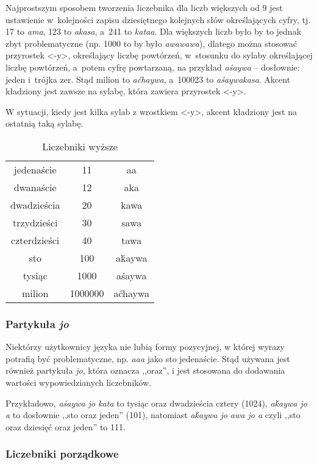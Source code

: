 \begin{spacing}{1.1}
Najprostszym sposobem tworzenia liczebnika dla liczb większych od 9 jest
ustawienie w~kolejności zapisu dziesiętnego kolejnych słów określających cyfry,
tj. 17 to \emph{ama}, 123 to \emph{akasa}, a~241 to \emph{kataa}. Dla większych
liczb było by to jednak zbyt problematyczne (np. 1000 to by było
\emph{awawawa}), dlatego można stosować przyrostek <-y>, określający liczbę
powtórzeń, w~stosunku do sylaby określającej liczbę powtórzeń, a~potem cyfrę
powtarzaną, na przykład \emph{aśaywa} -- dosłownie: jeden i~trójka zer. Stąd
milion to \emph{aćhaywa}, a~100023 to \emph{aśaywakasa}. Akcent kładziony jest
zawsze na sylabę, która zawiera przyrostek <-y>.

W sytuacji, kiedy jest kilka sylab z wrostkiem <-y>, akcent kładziony jest na
ostatnią taką sylabę.

\begin{table}[ht]
	\centering
	\caption{Liczebniki wyższe}
	\begin{tabular}{ccc} \toprule
		jedenaście & 11 & aa \\
		dwanaście & 12 & aka \\
		dwadzieścia & 20 & kawa \\
		trzydzieści & 30 & sawa \\
		czterdzieści & 40 & tawa \\
		sto & 100 & aḱaywa  \\
		tysiąc & 1000 & aśaywa \\
		milion & 1000000 & aćhaywa \\\bottomrule
	\end{tabular}
	\label{tab:numerals2}
\end{table}

\subsubsection{Partykuła \emph{jo}}

Niektórzy użytkownicy języka nie lubią formy pozycyjnej, w której wyrazy
potrafią być problematyczne, np. \emph{aaa} jako sto jedenaście. Stąd używana
jest również partykuła \emph{jo}, która oznacza ,,oraz'', i jest stosowana do
dodawania wartości wypowiedzianych liczebników.

Przykładowo, \emph{aśaywa jo kata} to tysiąc oraz dwadzieścia cztery (1024),
\emph{aḱaywa jo a} to dosłownie ,,sto oraz jeden'' (101), natomiast
\emph{aḱaywa jo awa jo a} czyli ,,sto oraz dziesięć oraz jeden'' to 111.

\subsubsection{Liczebniki porządkowe}


\end{spacing}
